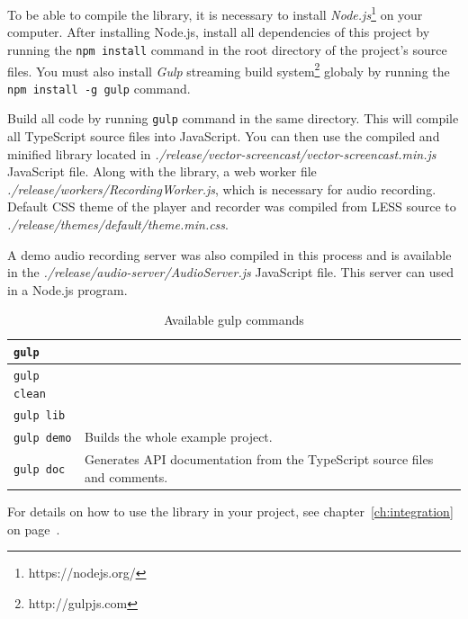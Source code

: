 To be able to compile the library, it is necessary to install \textit{Node.js}\footnote{https://nodejs.org/} on your computer. After installing Node.js, install all dependencies of this project by running the \verb|npm install| command in the root directory of the project's source files. You must also install \textit{Gulp} streaming build system\footnote{http://gulpjs.com} globaly by running the \verb|npm install -g gulp| command.

Build all code by running \verb|gulp| command in the same directory. This will compile all TypeScript source files into JavaScript. You can then use the compiled and minified library located in \textit{./release/vector-screencast/vector-screencast.min.js} JavaScript file. Along with the library, a web worker file \textit{./release/workers/RecordingWorker.js}, which is necessary for audio recording. Default CSS theme of the player and recorder was compiled from LESS source to \textit{./release/themes/default/theme.min.css}.

A demo audio recording server was also compiled in this process and is available in the \textit{./release/audio-server/AudioServer.js} JavaScript file. This server can used in a Node.js program.

\begin{table}
  \begin{tabular}{ll}
  \hline
  
  \verb|gulp|             &     \\ \hline 
  \verb|gulp clean|       &     \\ \hline
  \verb|gulp lib|         &     \\ \hline
  \verb|gulp demo|        & Builds the whole example project.  \\ \hline
  \verb|gulp doc|         & Generates API documentation from the TypeScript source files and comments. \\ \hline

  \end{tabular}
  \label{tbl:gulp}
  \caption{Available gulp commands}
\end{table}


For details on how to use the library in your project, see chapter~\ref{ch:integration} on page~\pageref{ch:integration}.